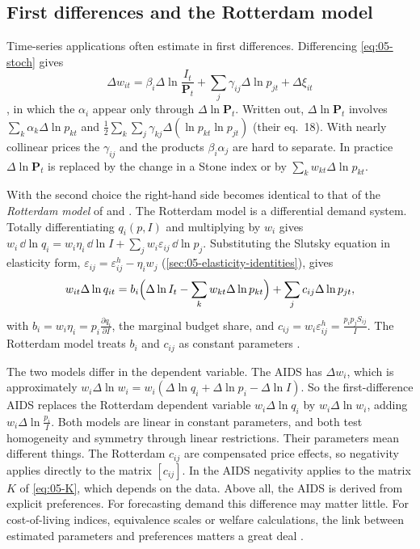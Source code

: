 \subsection{First differences and the Rotterdam model}\label{sec:05-rotterdam}

Time-series applications often estimate in first differences. Differencing \eqref{eq:05-stoch} gives
\begin{equation}\label{eq:05-fd-aids}
  \Delta w_{it} = \beta_i\Delta\ln\frac{I_t}{\mathbf{P}_t} + \sum_j\gamma_{ij}\Delta\ln p_{jt}
  + \Delta\xi_{it}
\end{equation}
\citep[eq.~17]{DeatonMuellbauer1980a}, in which the $\alpha_i$ appear only through $\Delta\ln\mathbf{P}_t$.
Written out, $\Delta\ln\mathbf{P}_t$ involves $\sum_k\alpha_k\Delta\ln p_{kt}$ and $\frac{1}{2}\sum_k\sum_j
\gamma_{kj}\Delta(\ln p_{kt}\ln p_{jt})$ (their eq.~18). With nearly collinear prices the $\gamma_{ij}$ and
the products $\beta_i\alpha_j$ are hard to separate. In practice $\Delta\ln\mathbf{P}_t$ is replaced by
the change in a Stone index or by $\sum_k w_{kt}\Delta\ln p_{kt}$.

With the second choice the right-hand side becomes identical to that of the \emph{Rotterdam model} of
\citet{Theil1965} and \citet{Barten1969}. The Rotterdam model is a differential demand system. Totally
differentiating $q_i(p, I)$ and multiplying by $w_i$ gives $w_i\,\dd\ln q_i = w_i\eta_i\,\dd\ln I +
\sum_j w_i\varepsilon_{ij}\,\dd\ln p_j$. Substituting the Slutsky equation in elasticity form,
$\varepsilon_{ij} = \varepsilon^h_{ij} - \eta_i w_j$ (\cref{sec:05-elasticity-identities}), gives
\begin{equation}\label{eq:05-rotterdam}
  w_{it}\Delta\ln q_{it} = b_i\Bigl(\Delta\ln I_t - \sum_k w_{kt}\Delta\ln p_{kt}\Bigr)
  + \sum_j c_{ij}\Delta\ln p_{jt},
\end{equation}
with $b_i = w_i\eta_i = p_i\frac{\partial q_i}{\partial I}$, the marginal budget share, and $c_{ij} =
w_i\varepsilon^h_{ij} = \frac{p_ip_jS_{ij}}{I}$. The Rotterdam model treats $b_i$ and $c_{ij}$ as constant
parameters \citep[eq.~19]{DeatonMuellbauer1980a}.

The two models differ in the dependent variable. The AIDS has $\Delta w_i$, which is approximately $w_i
\Delta\ln w_i = w_i(\Delta\ln q_i + \Delta\ln p_i - \Delta\ln I)$. So the first-difference AIDS replaces the
Rotterdam dependent variable $w_i\Delta\ln q_i$ by $w_i\Delta\ln w_i$, adding $w_i\Delta\ln\frac{p_i}{I}$.
Both models are linear in constant parameters, and both test homogeneity and symmetry through linear
restrictions. Their parameters mean different things. The Rotterdam $c_{ij}$ are compensated price effects,
so negativity applies directly to the matrix $[c_{ij}]$. In the AIDS negativity applies to the matrix $K$
of \eqref{eq:05-K}, which depends on the data. Above all, the AIDS is derived from explicit preferences.
For forecasting demand this difference may matter little. For cost-of-living indices, equivalence scales
or welfare calculations, the link between estimated parameters and preferences matters a great deal
\citep[pp.~317--318]{DeatonMuellbauer1980a}.

